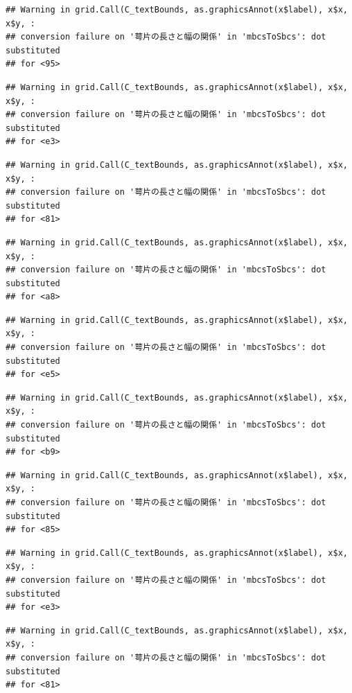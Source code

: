 \documentclass[
]{book}
\begin{document}
\begin{verbatim}
## Warning in grid.Call(C_textBounds, as.graphicsAnnot(x$label), x$x, x$y, :
## conversion failure on '萼片の長さと幅の関係' in 'mbcsToSbcs': dot substituted
## for <95>
\end{verbatim}

\begin{verbatim}
## Warning in grid.Call(C_textBounds, as.graphicsAnnot(x$label), x$x, x$y, :
## conversion failure on '萼片の長さと幅の関係' in 'mbcsToSbcs': dot substituted
## for <e3>
\end{verbatim}

\begin{verbatim}
## Warning in grid.Call(C_textBounds, as.graphicsAnnot(x$label), x$x, x$y, :
## conversion failure on '萼片の長さと幅の関係' in 'mbcsToSbcs': dot substituted
## for <81>
\end{verbatim}

\begin{verbatim}
## Warning in grid.Call(C_textBounds, as.graphicsAnnot(x$label), x$x, x$y, :
## conversion failure on '萼片の長さと幅の関係' in 'mbcsToSbcs': dot substituted
## for <a8>
\end{verbatim}

\begin{verbatim}
## Warning in grid.Call(C_textBounds, as.graphicsAnnot(x$label), x$x, x$y, :
## conversion failure on '萼片の長さと幅の関係' in 'mbcsToSbcs': dot substituted
## for <e5>
\end{verbatim}

\begin{verbatim}
## Warning in grid.Call(C_textBounds, as.graphicsAnnot(x$label), x$x, x$y, :
## conversion failure on '萼片の長さと幅の関係' in 'mbcsToSbcs': dot substituted
## for <b9>
\end{verbatim}

\begin{verbatim}
## Warning in grid.Call(C_textBounds, as.graphicsAnnot(x$label), x$x, x$y, :
## conversion failure on '萼片の長さと幅の関係' in 'mbcsToSbcs': dot substituted
## for <85>
\end{verbatim}

\begin{verbatim}
## Warning in grid.Call(C_textBounds, as.graphicsAnnot(x$label), x$x, x$y, :
## conversion failure on '萼片の長さと幅の関係' in 'mbcsToSbcs': dot substituted
## for <e3>
\end{verbatim}

\begin{verbatim}
## Warning in grid.Call(C_textBounds, as.graphicsAnnot(x$label), x$x, x$y, :
## conversion failure on '萼片の長さと幅の関係' in 'mbcsToSbcs': dot substituted
## for <81>
\end{verbatim}
\end{document}
